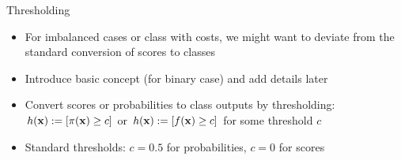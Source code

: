 \documentclass[11pt,compress,t,notes=noshow, xcolor=table]{beamer}
\begin{document}
\begin{frame}{Thresholding}
  
\begin{itemize}
\item For imbalanced cases or class with costs, we might want to deviate from the standard conversion of scores to classes 
\item Introduce basic concept (for binary case) and add details later
\item Convert scores or probabilities to class outputs by thresholding: \\[0.5ex]
$h(\mathbf{x}):= [\pi(\mathbf{x}) \ge c]$ or $h(\mathbf{x}) := [f(\mathbf{x}) \ge c]$ for some threshold $c$
\item Standard thresholds: $c = 0.5$ for probabilities, $c = 0$ for scores

\end{itemize}



\end{frame}
\end{document}
